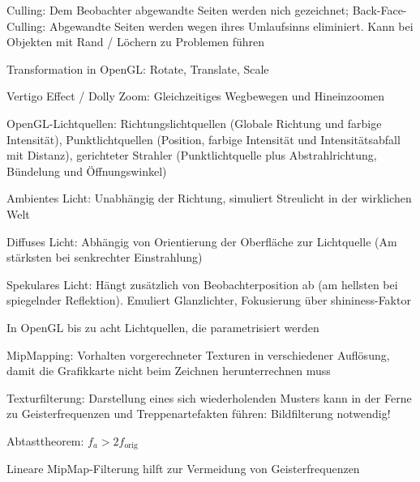 \documentclass[12pt,landscape]{article}
\begin{document}
\begin{multicols}{3}
\begin{compactitem}
\item Culling: Dem Beobachter abgewandte Seiten werden nich gezeichnet; Back-Face-Culling: Abgewandte Seiten werden wegen ihres Umlaufsinns eliminiert. Kann bei Objekten mit Rand / Löchern zu Problemen führen
\item Transformation in OpenGL: Rotate, Translate, Scale
\item Vertigo Effect / Dolly Zoom: Gleichzeitiges Wegbewegen und Hineinzoomen
\item OpenGL-Lichtquellen: Richtungslichtquellen (Globale Richtung und farbige Intensität), Punktlichtquellen (Position, farbige Intensität und Intensitätsabfall mit Distanz), gerichteter Strahler (Punktlichtquelle plus Abstrahlrichtung, Bündelung und Öffnungswinkel)
\item Ambientes Licht: Unabhängig der Richtung, simuliert Streulicht in der wirklichen Welt
\item Diffuses Licht: Abhängig von Orientierung der Oberfläche zur Lichtquelle (Am stärksten bei senkrechter Einstrahlung)
\item Spekulares Licht: Hängt zusätzlich von Beobachterposition ab (am hellsten bei spiegelnder Reflektion). Emuliert Glanzlichter, Fokusierung über shininess-Faktor
\item In OpenGL bis zu acht Lichtquellen, die parametrisiert werden
\item MipMapping: Vorhalten vorgerechneter Texturen in verschiedener Auflösung, damit die Grafikkarte nicht beim Zeichnen herunterrechnen muss
\item Texturfilterung: Darstellung eines sich wiederholenden Musters kann in der Ferne zu Geisterfrequenzen und Treppenartefakten führen: Bildfilterung notwendig!
\item Abtasttheorem: $f_a > 2f_{\text{orig}}$
\item Lineare MipMap-Filterung hilft zur Vermeidung von Geisterfrequenzen
\end{compactitem}

\end{multicols}
\end{document}
